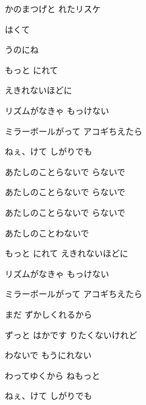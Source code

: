\documentclass[a4paper,tate,twocolumn,12pt]{ltjtarticle}
\begin{document}
\begin{flushleft}
\begin{minipage}{\linewidth}
かのまつげと れたリスケ

はくて

うのにね
\end{minipage}

\vspace{2em}

\noindent\begin{minipage}{\linewidth}
もっと にれて

えきれないほどに

リズムがなきゃ もっけない

ミラーボールがって アコギちえたら

ねぇ、けて しがりでも
\end{minipage}

\vspace{2em}

\noindent\begin{minipage}{\linewidth}
あたしのことらないで らないで

あたしのことらないで らないで

あたしのことらないで らないで

あたしのことわないで
\end{minipage}

\vspace{2em}

\noindent\begin{minipage}{\linewidth}
もっと にれて えきれないほどに

リズムがなきゃ もっけない

ミラーボールがって アコギちえたら

まだ ずかしくれるから

ずっと はかです りたくないけれど

わないで もうにれない

わってゆくから ねもっと

ねぇ、けて しがりでも
\end{minipage}

\end{flushleft}
\end{document}

